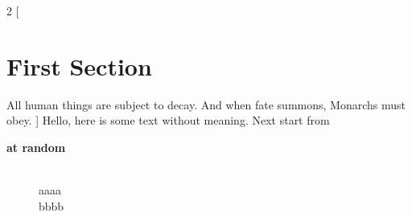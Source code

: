 \documentclass[12pt,twoside,a4paper]{article}
\begin{document}
\begin{multicols}{2}
  [
  \section{First Section}
  All human things are subject to decay. And when fate summons, Monarchs must obey.
  ]
  Hello, here is some text without meaning. Next start from

  \columnbreak
  \begin{description}
    \item[\large{\textbf{at random}}]\mbox{}\\
    aaaa \\
    bbbb
  \end{description}


\end{multicols}
\end{document}
